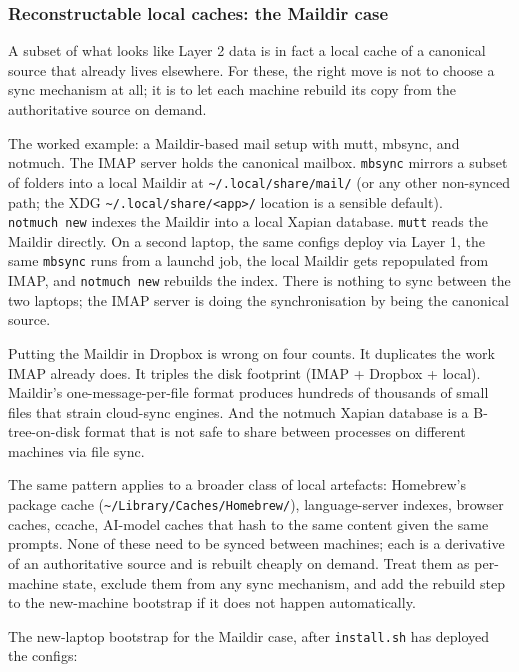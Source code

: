 \documentclass[
  11pt,
  letterpaper,
  DIV=11,
  numbers=noendperiod]{scrartcl}
\begin{document}
\subsubsection{Reconstructable local caches: the Maildir
case}\label{reconstructable-local-caches-the-maildir-case}

A subset of what looks like Layer 2 data is in fact a local cache of a
canonical source that already lives elsewhere. For these, the right move
is not to choose a sync mechanism at all; it is to let each machine
rebuild its copy from the authoritative source on demand.

The worked example: a Maildir-based mail setup with mutt, mbsync, and
notmuch. The IMAP server holds the canonical mailbox. \texttt{mbsync}
mirrors a subset of folders into a local Maildir at
\texttt{\textasciitilde{}/.local/share/mail/} (or any other non-synced
path; the XDG
\texttt{\textasciitilde{}/.local/share/\textless{}app\textgreater{}/}
location is a sensible default). \texttt{notmuch\ new} indexes the
Maildir into a local Xapian database. \texttt{mutt} reads the Maildir
directly. On a second laptop, the same configs deploy via Layer 1, the
same \texttt{mbsync} runs from a launchd job, the local Maildir gets
repopulated from IMAP, and \texttt{notmuch\ new} rebuilds the index.
There is nothing to sync between the two laptops; the IMAP server is
doing the synchronisation by being the canonical source.

Putting the Maildir in Dropbox is wrong on four counts. It duplicates
the work IMAP already does. It triples the disk footprint (IMAP +
Dropbox + local). Maildir's one-message-per-file format produces
hundreds of thousands of small files that strain cloud-sync engines. And
the notmuch Xapian database is a B-tree-on-disk format that is not safe
to share between processes on different machines via file sync.

The same pattern applies to a broader class of local artefacts:
Homebrew's package cache
(\texttt{\textasciitilde{}/Library/Caches/Homebrew/}), language-server
indexes, browser caches, ccache, AI-model caches that hash to the same
content given the same prompts. None of these need to be synced between
machines; each is a derivative of an authoritative source and is rebuilt
cheaply on demand. Treat them as per-machine state, exclude them from
any sync mechanism, and add the rebuild step to the new-machine
bootstrap if it does not happen automatically.

The new-laptop bootstrap for the Maildir case, after \texttt{install.sh}
has deployed the configs:
\end{document}
